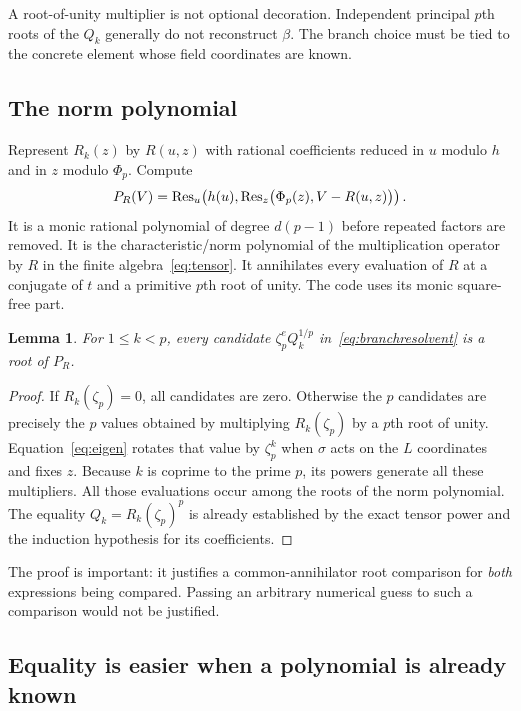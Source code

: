 \documentclass[11pt]{article}
\newtheorem{lemma}[theorem]{Lemma}
\theoremstyle{definition}\newtheorem{definition}[theorem]{Definition}
\theoremstyle{remark}\newtheorem{remark}[theorem]{Remark}
\begin{document}
A root-of-unity multiplier is not optional decoration. Independent principal
$p$th roots of the $Q_k$ generally do not reconstruct $\beta$. The branch
choice must be tied to the concrete element whose field coordinates are known.

\subsection{The norm polynomial}

Represent $R_k(z)$ by $R(u,z)$ with rational coefficients reduced in $u$ modulo
$h$ and in $z$ modulo $\Phi_p$. Compute
\begin{equation}\label{eq:norm}
 P_R(V)=\operatorname{Res}_u\!\left(h(u),
       \operatorname{Res}_z\bigl(\Phi_p(z),V-R(u,z)\bigr)\right).
\end{equation}
It is a monic rational polynomial of degree $d(p-1)$ before repeated factors
are removed. It is the characteristic/norm polynomial of the multiplication
operator by $R$ in the finite algebra~\eqref{eq:tensor}. It annihilates every
evaluation of $R$ at a conjugate of $t$ and a primitive $p$th root of unity.
The code uses its monic square-free part.

\begin{lemma}\label{lem:allbranches}
For $1\le k<p$, every candidate
$\zeta_p^e Q_k^{1/p}$ in~\eqref{eq:branchresolvent} is a root of $P_R$.
\end{lemma}
\begin{proof}
If $R_k(\zeta_p)=0$, all candidates are zero. Otherwise the $p$ candidates
are precisely the $p$ values obtained by multiplying $R_k(\zeta_p)$ by a
$p$th root of unity. Equation~\eqref{eq:eigen} rotates that value by
$\zeta_p^k$ when $\sigma$ acts on the $L$ coordinates and fixes $z$.
Because $k$ is coprime to the prime $p$, its powers generate all these
multipliers. All those evaluations occur among the roots of the norm
polynomial. The equality $Q_k=R_k(\zeta_p)^p$ is already established by the
exact tensor power and the induction hypothesis for its coefficients.
\end{proof}

The proof is important: it justifies a common-annihilator root comparison for
\emph{both} expressions being compared. Passing an arbitrary numerical guess
to such a comparison would not be justified.

\subsection{Equality is easier when a polynomial is already known}
\end{document}
